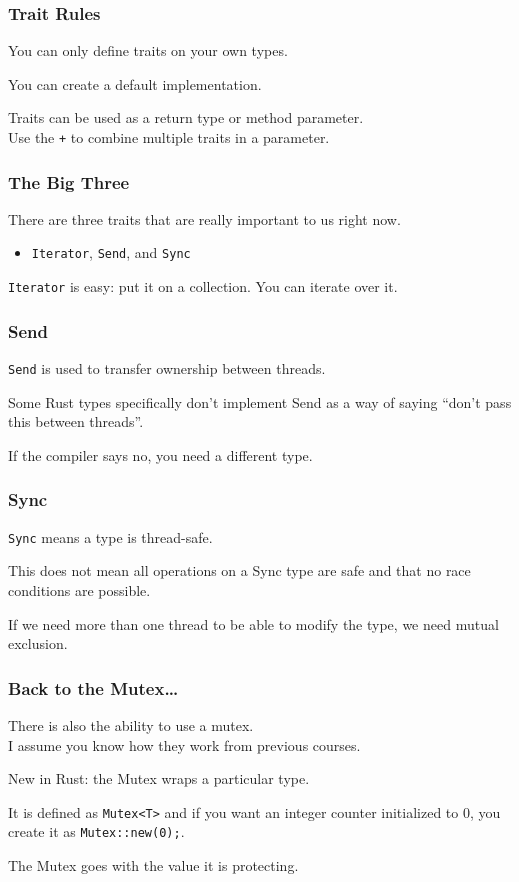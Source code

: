 \begin{frame}
\frametitle{Trait Rules}

You can only define traits on your own types.

You can create a default implementation.

Traits can be used as a return type or method parameter.\\
\quad Use the \texttt{+} to combine multiple traits in a parameter.

\end{frame}


\begin{frame}
\frametitle{The Big Three}

There are three traits that are really important to us right now. 

\begin{itemize}
\item \texttt{Iterator}, \texttt{Send}, and \texttt{Sync}
\end{itemize}


\texttt{Iterator} is easy: put it on a collection. You can iterate over it.
\end{frame}


\begin{frame}
\frametitle{Send}

\texttt{Send} is used to transfer ownership between threads.

Some Rust types specifically don't implement Send as a way of saying ``don't pass this between threads''. 

If the compiler says no, you need a different type.

\end{frame}


\begin{frame}
\frametitle{Sync}

\texttt{Sync} means a type is thread-safe.


This does not mean all operations on a Sync type are safe and that no race conditions are possible.

If we need more than one thread to be able to modify the type, we need mutual exclusion.
\end{frame}


\begin{frame}
\frametitle{Back to the Mutex\ldots}
There is also the ability to use a mutex.\\
\quad I assume you know how they work from previous courses.

New in Rust: the Mutex wraps a particular type.

It is defined as \texttt{Mutex<T>} and if you want an integer counter initialized to 0, you create it as \texttt{Mutex::new(0);}.


The Mutex goes with the value it is protecting.
\end{frame}


